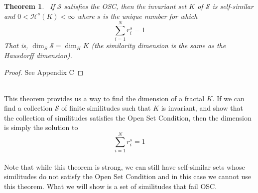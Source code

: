 \documentclass{article}
\theoremstyle{plain}
\newtheorem{thm}{Theorem}[section]
\theoremstyle{definition}
\theoremstyle{remark}
\begin{document}
\noindent{}

\begin{thm}~\label{thm:haus_similar_connection}
    If $\mathcal{S}$ satisfies the OSC, then the invariant set $K$ of $\mathcal{S}$ is self-similar and $0 < \mathcal{H}^s(K)<\infty$ where $s$ is the unique number for which \[
    \sum \limits _{i=1}^N r_i^s = 1
    \]
    That is, $\dim _S \mathcal{S} = \dim _H K$ (the similarity dimension is the same as the Hausdorff dimension).
\end{thm}
\begin{proof}
    See Appendix C
\end{proof}
~\\This theorem provides us a way to find the dimension of a fractal $K$. If we can find a collection $\mathcal{S}$ of finite similitudes such that $K$ is invariant, and show that the collection of similitudes satisfies the Open Set Condition, then the dimension is simply the solution to \[
\sum \limits _{i=1}^N r_i^s = 1
\]
~\\
Note that while this theorem is strong, we can still have self-similar sets whose similitudes do not satisfy the Open Set Condition and in this case we cannot use this theorem. What we will show is a set of similitudes that fail OSC.
\end{document}
